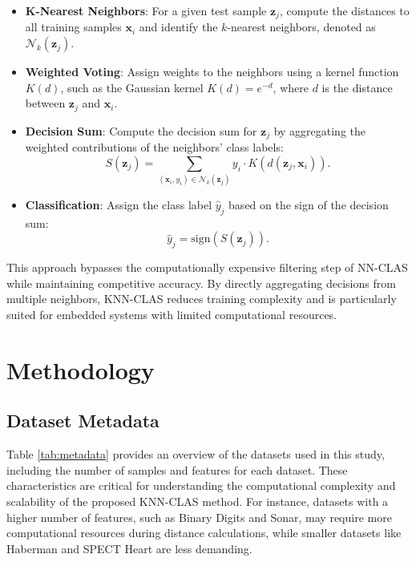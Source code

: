 \documentclass[conference]{IEEEtran}
\begin{document}
\begin{itemize}
    \item \textbf{K-Nearest Neighbors}: For a given test sample \( \mathbf{z}_j \), compute the distances to all training samples \( \mathbf{x}_i \) and identify the \( k \)-nearest neighbors, denoted as \( \mathcal{N}_k(\mathbf{z}_j) \).

    \item \textbf{Weighted Voting}: Assign weights to the neighbors using a kernel function \( K(d) \), such as the Gaussian kernel \( K(d) = e^{-d} \), where \( d \) is the distance between \( \mathbf{z}_j \) and \( \mathbf{x}_i \).

    \item \textbf{Decision Sum}: Compute the decision sum for \( \mathbf{z}_j \) by aggregating the weighted contributions of the neighbors' class labels:
    \[
    S(\mathbf{z}_j) = \sum_{(\mathbf{x}_i, y_i) \in \mathcal{N}_k(\mathbf{z}_j)} y_i \cdot K(d(\mathbf{z}_j, \mathbf{x}_i)).
    \]

    \item \textbf{Classification}: Assign the class label \( \hat{y}_j \) based on the sign of the decision sum:
    \[
    \hat{y}_j = \text{sign}(S(\mathbf{z}_j)).
    \]
\end{itemize}

This approach bypasses the computationally expensive filtering step of NN-CLAS while maintaining competitive accuracy. By directly aggregating decisions from multiple neighbors, KNN-CLAS reduces training complexity and is particularly suited for embedded systems with limited computational resources.

\section{Methodology}

\subsection{Dataset Metadata}


Table \ref{tab:metadata} provides an overview of the datasets used in this study, including the number of samples and features for each dataset. These characteristics are critical for understanding the computational complexity and scalability of the proposed KNN-CLAS method. For instance, datasets with a higher number of features, such as Binary Digits and Sonar, may require more computational resources during distance calculations, while smaller datasets like Haberman and SPECT Heart are less demanding.
\end{document}
